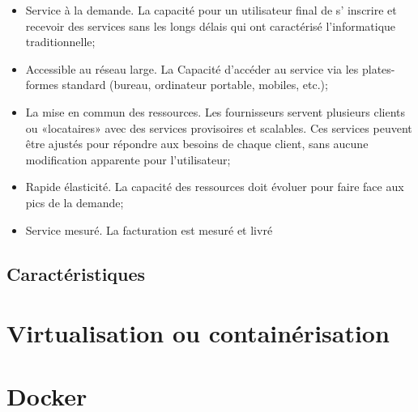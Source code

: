 \begin{onehalfspace}
\begin{itemize}

\item Service à la demande. La capacité pour un utilisateur final de s' inscrire et recevoir des services sans les longs délais qui ont caractérisé l'informatique traditionnelle;

\item Accessible au réseau large. La Capacité d'accéder au service via les plates-formes standard (bureau, ordinateur portable, mobiles, etc.);

\item La mise en commun des ressources. Les fournisseurs servent plusieurs clients ou «locataires» avec des services provisoires et scalables. Ces services peuvent être ajustés pour répondre aux besoins de chaque client, sans aucune modification apparente pour l'utilisateur;

\item Rapide élasticité. La capacité des ressources doit évoluer pour faire face aux pics de la demande;

\item Service mesuré. La facturation est mesuré et livré



\end{itemize}


\subsection{Caractéristiques}

\section{Virtualisation ou containérisation}

\section{Docker}

\end{onehalfspace}